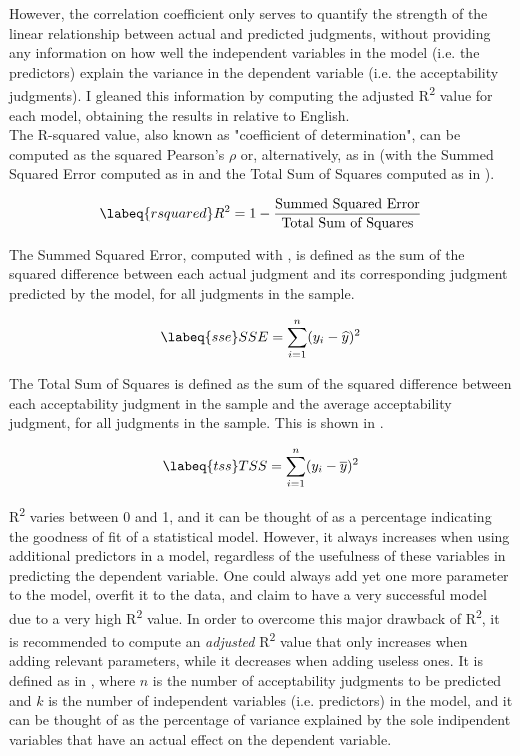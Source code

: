 However, the correlation coefficient only serves to quantify the strength of the linear relationship between actual and predicted judgments, without providing any information on how well the independent variables in the model (i.e. the predictors) explain the variance in the dependent variable (i.e. the acceptability judgments). I gleaned this information by computing the adjusted R\textsuperscript{2} value for each model, obtaining the results in  relative to English.\\
The R-squared value, also known as "coefficient of determination", can be computed as the squared Pearson's $\rho$ or, alternatively, as in  (with the Summed Squared Error computed as in  and the Total Sum of Squares computed as in ).

\begin{equation} \labeq{rsquared}
R^2 = 1 - \frac{\textrm{Summed Squared Error}}{\textrm{Total Sum of Squares}}
\end{equation}

The Summed Squared Error, computed with , is defined as the sum of the squared difference between each actual judgment and its corresponding judgment predicted by the model, for all judgments in the sample.

\begin{equation} \labeq{sse}
SSE = \sum_{i=1}^{n} (y_i - \widehat{y})^2
\end{equation}

The Total Sum of Squares is defined as the sum of the squared difference between each acceptability judgment in the sample and the average acceptability judgment, for all judgments in the sample. This is shown in .

\begin{equation} \labeq{tss}
TSS = \sum_{i=1}^{n} (y_i - \overline{y})^2
\end{equation}

R\textsuperscript{2} varies between 0 and 1, and it can be thought of as a percentage indicating the goodness of fit of a statistical model. However, it always increases when using additional predictors in a model, regardless of the usefulness of these variables in predicting the dependent variable. One could always add yet one more parameter to the model, overfit it to the data, and claim to have a very successful model due to a very high R\textsuperscript{2} value. In order to overcome this major drawback of R\textsuperscript{2}, it is recommended to compute an \textit{adjusted} R\textsuperscript{2} value that only increases when adding relevant parameters, while it decreases when adding useless ones. It is defined as in , where $n$ is the number of acceptability judgments to be predicted and $k$ is the number of independent variables (i.e. predictors) in the model, and it can be thought of as the percentage of variance explained by the sole indipendent variables that have an actual effect on the dependent variable.


